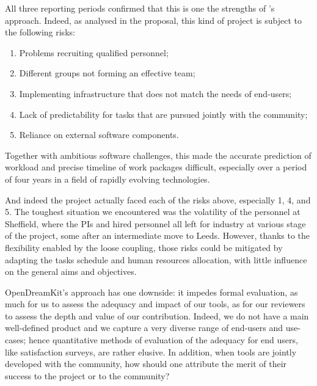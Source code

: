 All three reporting periods confirmed that this is one the strengths
of \ODK's approach. Indeed, as analysed in the proposal, this
kind of project is subject to the following risks:
\begin{enumerate}
\item Problems recruiting qualified personnel;
\item Different groups not forming an effective team;
\item Implementing infrastructure that does not match the needs of end-users;
\item Lack of predictability for tasks that are pursued jointly with
  the community;
\item Reliance on external software components.
\end{enumerate}
Together with ambitious software challenges, this made the accurate
prediction of workload and precise timeline of work packages
difficult, especially over a period of four years in a field of
rapidly evolving technologies.

And indeed the project actually faced each of the risks above,
especially 1, 4, and 5.
The toughest situation we encountered was the volatility of the personnel at
Sheffield, where the PIs and hired personnel all left for industry at
various stage of the project, some after an intermediate move to
Leeds. However, thanks to the flexibility enabled by
the loose coupling, those risks could be mitigated by adapting the
tasks schedule and human resources allocation, with little influence
on the general aims and objectives.


OpenDreamKit's approach has one downside: it impedes formal
evaluation, as much for us to assess the adequacy and impact of our
tools, as for our reviewers to assess the depth and value of our
contribution. Indeed, we do not have a main well-defined product and
we capture a very diverse range of end-users and use-cases; hence
quantitative methods of evaluation of the adequacy for end users, like
satisfaction surveys, are rather elusive. In addition, when tools are
jointly developed with the community, how should one attribute the
merit of their success to the project or to the community?

